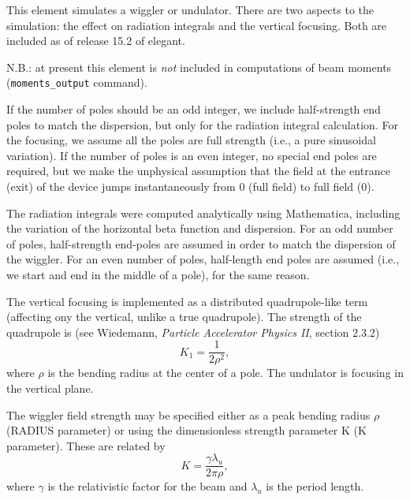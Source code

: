 This element simulates a wiggler or undulator.  There are two aspects
to the simulation: the effect on radiation integrals and the vertical
focusing.  Both are included as of release 15.2 of elegant.  

N.B.: at present this element is {\em not} included in computations
of beam moments (\verb|moments_output| command).

If the number of poles should be an odd integer, we include
half-strength end poles to match the dispersion, but only for the
radiation integral calculation.  For the focusing, we assume all the
poles are full strength (i.e., a pure sinusoidal variation).  If the
number of poles is an even integer, no special end poles are required,
but we make the unphysical assumption that the field at the entrance
(exit) of the device jumps instantaneously from 0 (full field) to full
field (0).

The radiation integrals were computed analytically using Mathematica,
including the variation of the horizontal beta function and dispersion. 
For an odd number of poles, half-strength end-poles are assumed in order
to match the dispersion of the wiggler.  For an even number of poles,
half-length end poles are assumed (i.e., we start and end in 
the middle of a pole), for the same reason.

The vertical focusing is implemented as a distributed quadrupole-like
term (affecting ony the vertical, unlike a true quadrupole).  The
strength of the quadrupole is (see Wiedemann, {\em Particle Accelerator
Physics II}, section 2.3.2)
\begin{equation}
K_1 = \frac{1}{2\rho^2},
\end{equation}
where $\rho$ is the bending radius at the center of a pole.  The
undulator is focusing in the vertical plane.

The wiggler field strength may be specified either as a peak bending 
radius $\rho$ (RADIUS parameter) or using the dimensionless strength parameter
K (K parameter).  These are related by
\begin{equation}
K = \frac{\gamma \lambda_u}{2 \pi \rho},
\end{equation}
where $\gamma$ is the relativistic factor for the beam and $\lambda_u$ is
the period length.

